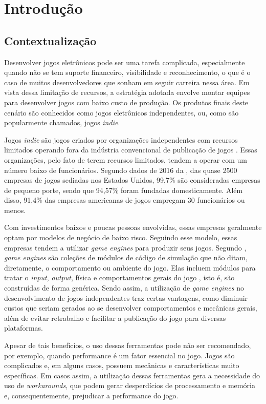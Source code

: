\chapter*[Introdução]{Introdução}

\section*{Contextualização}

Desenvolver jogos eletrônicos pode ser uma tarefa complicada, especialmente quando não se tem suporte financeiro, visibilidade e reconhecimento, o que é o caso de muitos desenvolvedores que sonham em seguir carreira nessa área. Em vista dessa limitação de recursos, a estratégia adotada envolve montar equipes para desenvolver jogos com baixo custo de produção. Os produtos finais deste cenário são conhecidos como jogos eletrônicos independentes, ou, como são popularmente chamados, jogos \textit{indie}.

Jogos \textit{indie} são jogos criados por organizações independentes com recursos limitados operando fora da indústria convencional de publicação de jogos \cite{end2end}. Essas organizações, pelo fato de terem recursos limitados, tendem a operar com um número baixo de funcionários. Segundo dados de 2016 da , das quase 2500 empresas de jogos sediadas nos Estados Unidos, 99,7\% são consideradas empresas de pequeno porte, sendo que 94,57\% foram fundadas domesticamente. Além disso, 91,4\% das empresas americanas de jogos empregam 30 funcionários ou menos.

Com investimentos baixos e poucas pessoas envolvidas, essas empresas geralmente optam por modelos de negócio de baixo risco. Seguindo esse modelo, essas empresas tendem a utilizar \textit{game engines} para produzir seus jogos. Segundo , \textit{game engines} são coleções de módulos de código de simulação que não ditam, diretamente, o comportamento ou ambiente do jogo. Elas incluem módulos para tratar o \textit{input}, \textit{output}, física e comportamentos gerais do jogo \cite{gameengines}, isto é, são construídas de forma genérica. Sendo assim, a utilização de \textit{game engines} no desenvolvimento de jogos independentes traz certas vantagens, como diminuir custos que seriam gerados ao se desenvolver comportamentos e mecânicas gerais, além de evitar retrabalho e facilitar a publicação do jogo para diversas plataformas.

Apesar de tais benefícios, o uso dessas ferramentas pode não ser recomendado, por exemplo, quando performance é um fator essencial no jogo. Jogos são complicados e, em alguns casos, possuem mecânicas e características muito específicas. Em casos assim, a utilização dessas ferramentas gera a necessidade do uso de \textit{workarounds}, que podem gerar desperdícios de processamento e memória e, consequentemente, prejudicar a performance do jogo.

